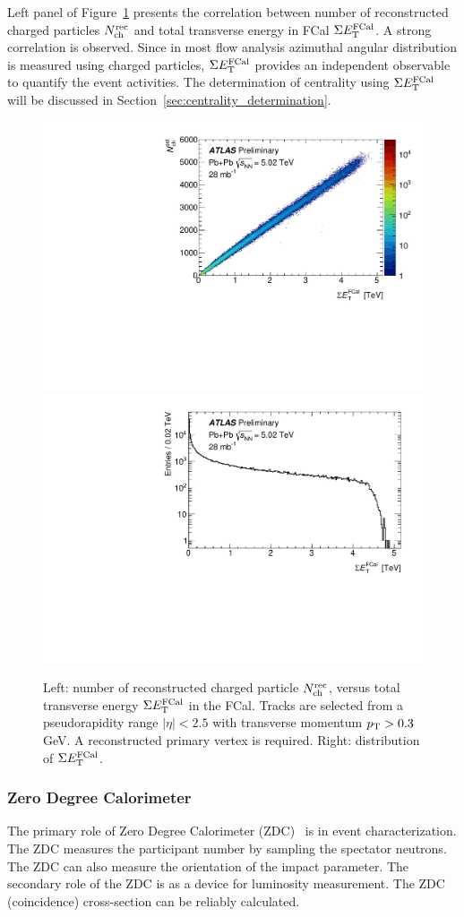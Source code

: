 Left panel of Figure~\ref{fig:detector_ATLAS_FCal_Nch} presents the correlation between number of reconstructed charged particles $N_\text{ch}^\text{rec}$ and total transverse energy in FCal $\Sigma E_\text{T}^\text{FCal}$. A strong correlation is observed. Since in most flow analysis azimuthal angular distribution is measured using charged particles, $\Sigma E_\text{T}^\text{FCal}$ provides an independent observable to quantify the event activities. The determination of centrality using $\Sigma E_\text{T}^\text{FCal}$ will be discussed in Section~\ref{sec:centrality_determination}.

\begin{figure}[H]
\centering
\includegraphics[width=.475\linewidth]{figs/chapter_detector/ATLAS_FCal_Nch.pdf}
\includegraphics[width=.475\linewidth]{figs/chapter_detector/ATLAS_FCaldis.pdf}
\caption{Left: number of reconstructed charged particle $N_\text{ch}^\text{rec}$, versus total transverse energy $\Sigma E_\text{T}^\text{FCal}$ in the FCal. Tracks are selected from a pseudorapidity range $|\eta|<2.5$ with transverse momentum $p_\text{T}>0.3$ GeV. A reconstructed primary vertex is required. Right: distribution of $\Sigma E_\text{T}^\text{FCal}$.}
\label{fig:detector_ATLAS_FCal_Nch}
\end{figure}



\subsubsection{Zero Degree Calorimeter}
\label{sec:zero_degree_calorimeter}

The primary role of Zero Degree Calorimeter (ZDC)~\cite{ATLAS:2007aa} is in event characterization. The ZDC measures the participant number by sampling the spectator neutrons. The ZDC can also measure the orientation of the impact parameter. The secondary role of the ZDC is as a device for luminosity measurement. The ZDC (coincidence) cross-section can be reliably calculated.

